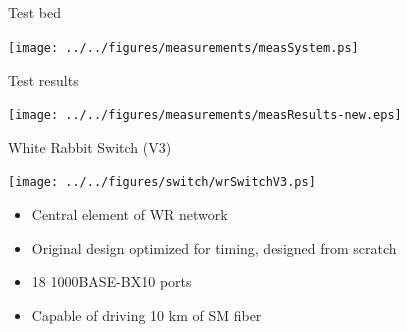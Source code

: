 \documentclass[compress,red]{beamer}
\begin{document}
\subsection{}
\begin{frame}{Test bed}

    \begin{center}
    \texttt{[image: ../../figures/measurements/measSystem.ps]}
    \end{center}

\end{frame}
\begin{frame}{Test results}

    \begin{center}
    \texttt{[image: ../../figures/measurements/measResults-new.eps]}
    \end{center}


\end{frame}
\begin{frame}{White Rabbit Switch (V3)}

    \begin{center}
    \texttt{[image: ../../figures/switch/wrSwitchV3.ps]}
    \end{center}

	\begin{itemize}
	\item Central element of WR network
	\item Original design optimized for timing, designed from scratch
	\item 18 1000BASE-BX10 ports
	\item Capable of driving 10 km of SM fiber
	\end{itemize}


\end{frame}
\end{document}
